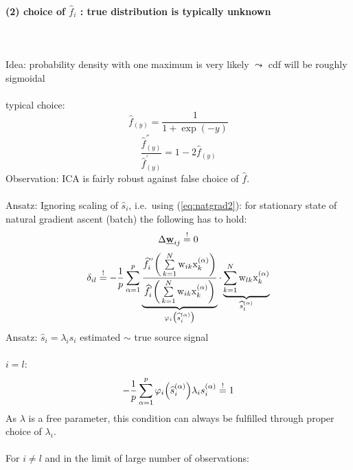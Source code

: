 \paragraph{(2) choice of $\widehat{f}_i$ : true distribution is typically unknown} \mbox{} \\\\
Idea: probability density with one maximum is very likely $\leadsto$ cdf will be roughly sigmoidal
\\\\
typical choice:
\begin{equation} \tag{logistic function}
	\widehat{f}_{(y)} = \frac{1}{1 + \exp(-y)}
\end{equation}
\begin{equation}
	\frac{\widehat{f}_{(y)}^{''}}{\widehat{f}_{(y)}^{'}}
	= 1 - 2 \widehat{f}_{(y)}
\end{equation}
Observation: ICA is fairly robust against false choice of $\widehat{f}$. \\\\
Ansatz: Ignoring scaling of $\hat{s}_i$, i.e.\ using (\ref{eq:natgrad2}):
for stationary state of natural gradient ascent (batch) the following has to hold:
\begin{equation}
	\Delta \underline{\mathbf{w}}_{ij} \stackrel{\mathrm{!}}{=} 0
\end{equation}
\begin{equation}
	\delta_{il} \stackrel{\mathrm{!}}{=} -\frac{1}{p} \sum\limits_{\alpha = 1}^p 
	\underbrace{ \frac{ \widehat{f}_i^{''} \bigg( 
		\sum\limits_{k = 1}^N 
		\mathrm{w}_{ik} \mathrm{x}_k^{(\alpha)} \bigg)
		}{\widehat{f}_i^{'} \bigg( \sum\limits_{k = 1}^N 
		\mathrm{w}_{ik} \mathrm{x}_k^{(\alpha)} \bigg)} }_{
			\varphi_i \big( \widehat{s}_i^{(\alpha)} \big) }
	\cdot \underbrace{ \sum\limits_{k = 1}^N \mathrm{w}_{lk} 
		\mathrm{x}_k^{(\alpha)} }_{
			\widehat{s}_l^{(\alpha)} }
\end{equation}
Ansatz: $\widehat{s}_i = \lambda_i s_i$ estimated $\sim$ true source signal\\\\
\indent $i = l$:
\begin{equation}
	-\frac{1}{p} \sum\limits_{\alpha = 1}^p \varphi_i \Big(
		\widehat{s}_i^{(\alpha)} \Big) \lambda_i s_i^{(\alpha)} 
		\stackrel{\mathrm{!}}{=} 1
\end{equation}
As $\lambda$ is a free parameter, this condition can always be fulfilled through proper choice of $\lambda_i$. \\\\
For $i \neq l$ and in the limit of large number of observations:
